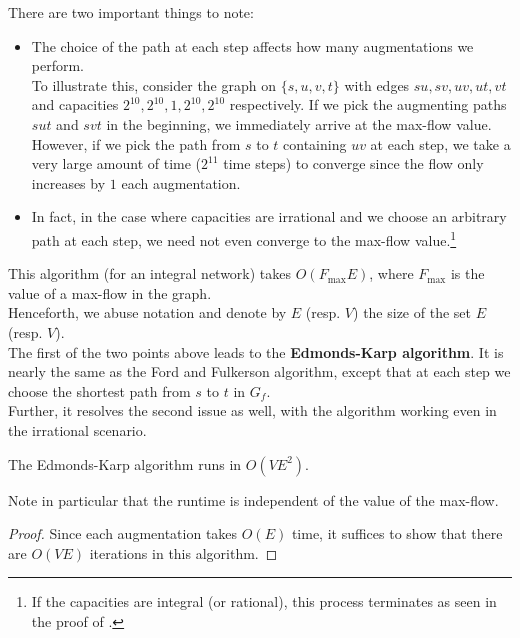			There are two important things to note:
			\begin{itemize}
				\item The choice of the path at each step affects how many augmentations we perform.\\
				To illustrate this, consider the graph on $\{s,u,v,t\}$ with edges $su,sv,uv,ut,vt$ and capacities $2^{10},2^{10},1,2^{10},2^{10}$ respectively. If we pick the augmenting paths $sut$ and $svt$ in the beginning, we immediately arrive at the max-flow value. However, if we pick the path from $s$ to $t$ containing $uv$ at each step, we take a very large amount of time ($2^{11}$ time steps) to converge since the flow only increases by $1$ each augmentation.

				\item In fact, in the case where capacities are irrational and we choose an arbitrary path at each step, we need not even converge to the max-flow value.\footnote{If the capacities are integral (or rational), this process terminates as seen in the proof of .}
			\end{itemize}

			This algorithm (for an integral network) takes $O(F_\text{max}E)$, where $F_\text{max}$ is the value of a max-flow in the graph.\\

			Henceforth, we abuse notation and denote by $E$ (resp. $V$) the size of the set $E$ (resp. $V$).\\

			The first of the two points above leads to the \textbf{Edmonds-Karp algorithm}. It is nearly the same as the Ford and Fulkerson algorithm, except that at each step we choose the shortest path from $s$ to $t$ in $G_f$. \\
			Further, it resolves the second issue as well, with the algorithm working even in the irrational scenario.

			\begin{ftheo}
				The Edmonds-Karp algorithm runs in $O(VE^2)$.
			\end{ftheo}
			Note in particular that the runtime is independent of the value of the max-flow.
			\begin{proof}
				Since each augmentation takes $O(E)$ time, it suffices to show that there are $O(VE)$ iterations in this algorithm.
			\end{proof}